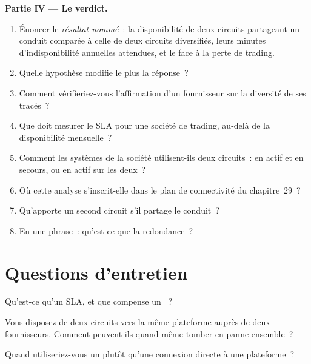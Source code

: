 \begin{problem}
\medskip\noindent\textbf{Partie IV --- Le verdict.}
\begin{enumerate}[resume]
\item Énoncer le \emph{résultat nommé}~: la disponibilité de deux circuits partageant un conduit comparée à celle de deux circuits diversifiés, leurs minutes d'indisponibilité annuelles attendues,
  et le  face à la perte de trading.
\item Quelle hypothèse modifie le plus la réponse~?
\item Comment vérifieriez-vous l'affirmation d'un fournisseur sur la diversité de ses tracés~?
\item Que doit mesurer le SLA pour une société de trading, au-delà de la disponibilité mensuelle~?
\item Comment les systèmes de la société utilisent-ils deux circuits~: en actif et en secours, ou en actif sur les deux~?
\item Où cette analyse s'inscrit-elle dans le plan de connectivité du chapitre~29~?
\item Qu'apporte un second circuit s'il partage le conduit~?
\item En une phrase~: qu'est-ce que la redondance~?
\end{enumerate}
\end{problem}

\section{Questions d'entretien}

\begin{interviewq}\label{iq:nw:buying-connectivity:1}
Qu'est-ce qu'un SLA, et que compense un ~?
\end{interviewq}

\begin{interviewq}\label{iq:nw:buying-connectivity:2}
Vous disposez de deux circuits vers la même plateforme auprès de deux fournisseurs. Comment peuvent-ils quand même tomber en panne ensemble~?
\end{interviewq}

\begin{interviewq}\label{iq:nw:buying-connectivity:3}
Quand utiliseriez-vous un  plutôt qu'une connexion directe à une plateforme~?
\end{interviewq}

